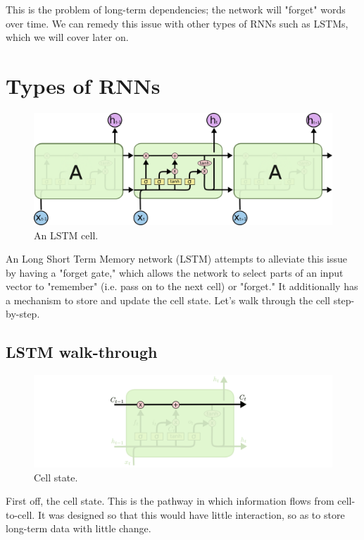 \documentclass{article}
\begin{document}
    This is the problem of long-term dependencies; the network will "forget" words over time. We can remedy this issue with other types of RNNs such as LSTMs, which we will cover later on.
\section{Types of RNNs}
    \begin{figure}[H]
        \centerline{\includegraphics[scale=0.4]{LSTM.png}}
        \caption{An LSTM cell.}
        \label{fig:lstm}
    \end{figure}
    An Long Short Term Memory network (LSTM) attempts to alleviate this issue by having a "forget gate," which allows the network to select parts of an input vector to "remember" (i.e. pass on to the next cell) or "forget." It additionally has a mechanism to store and update the cell state. Let's walk through the cell step-by-step.
    \subsection{LSTM walk-through}
    \begin{figure}[H]
        \centerline{\includegraphics[scale=0.4]{LSTM0.png}}
        \caption{Cell state.}
        \label{fig:lstm0}
    \end{figure}
    First off, the cell state. This is the pathway in which information flows from cell-to-cell. It was designed so that this would have little interaction, so as to store long-term data with little change. 
    
\end{document}
